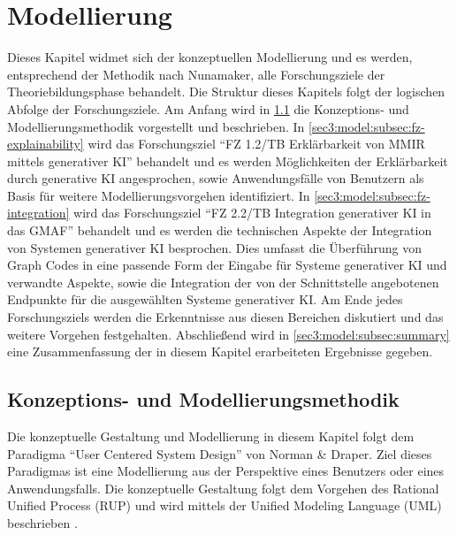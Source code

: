 \section{Modellierung}
\label{sec3:model}
Dieses Kapitel widmet sich der konzeptuellen Modellierung und es werden, entsprechend der Methodik nach Nunamaker, alle Forschungsziele der Theoriebildungsphase behandelt.
Die Struktur dieses Kapitels folgt der logischen Abfolge der Forschungsziele.
Am Anfang wird in \cref{sec3:model:subsec:concept-modeling-methodology} die Konzeptions- und Modellierungsmethodik vorgestellt und beschrieben.
In \cref{sec3:model:subsec:fz-explainability} wird das Forschungsziel \enquote{FZ 1.2/TB Erklärbarkeit von MMIR mittels generativer KI} behandelt und es werden Möglichkeiten der Erklärbarkeit durch generative KI angesprochen, sowie Anwendungsfälle von Benutzern als Basis für weitere Modellierungsvorgehen identifiziert.
In \cref{sec3:model:subsec:fz-integration} wird das Forschungsziel \enquote{FZ 2.2/TB Integration generativer KI in das GMAF} behandelt und es werden die technischen Aspekte der Integration von Systemen generativer KI besprochen.
Dies umfasst die Überführung von Graph Codes in eine passende Form der Eingabe für Systeme generativer KI und verwandte Aspekte, sowie die Integration der von der Schnittstelle angebotenen Endpunkte für die ausgewählten Systeme generativer KI.
Am Ende jedes Forschungsziels werden die Erkenntnisse aus diesen Bereichen diskutiert und das weitere Vorgehen festgehalten.
Abschließend wird in \cref{sec3:model:subsec:summary} eine Zusammenfassung der in diesem Kapitel erarbeiteten Ergebnisse gegeben.



\subsection{Konzeptions- und Modellierungsmethodik}
\label{sec3:model:subsec:concept-modeling-methodology}
Die konzeptuelle Gestaltung und Modellierung in diesem Kapitel folgt dem Paradigma \enquote{User Centered System Design} \cite{norman-draper-user-centered-system-design} von Norman \& Draper.
Ziel dieses Paradigmas ist eine Modellierung aus der Perspektive eines Benutzers oder eines Anwendungsfalls.
Die konzeptuelle Gestaltung folgt dem Vorgehen des Rational Unified Process (RUP) \cite{rup-quality} und wird mittels der Unified Modeling Language (UML) beschrieben \cite{rup-inff}.

